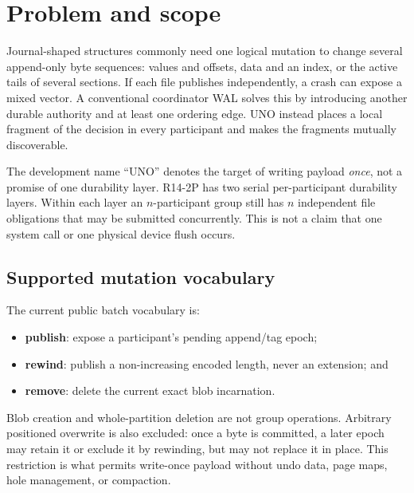 \documentclass[10pt,twocolumn]{article}
\theoremstyle{remark}
\begin{document}
\noindent{}

\section{Problem and scope}

Journal-shaped structures commonly need one logical mutation to change several append-only byte
sequences: values and offsets, data and an index, or the active tails of several sections. If each
file publishes independently, a crash can expose a mixed vector. A conventional coordinator WAL
solves this by introducing another durable authority and at least one ordering edge. UNO instead
places a local fragment of the decision in every participant and makes the fragments mutually
discoverable.

The development name ``UNO'' denotes the target of writing payload \emph{once}, not a promise of
one durability layer. R14-2P has two serial per-participant durability layers. Within each layer an
$n$-participant group still has $n$ independent file obligations that may be submitted
concurrently. This is not a claim that one system call or one physical device flush occurs.

\subsection{Supported mutation vocabulary}

The current public batch vocabulary is:
\begin{itemize}
  \item \textbf{publish}: expose a participant's pending append/tag epoch;
  \item \textbf{rewind}: publish a non-increasing encoded length, never an extension; and
  \item \textbf{remove}: delete the current exact blob incarnation.
\end{itemize}
Blob creation and whole-partition deletion are not group operations. Arbitrary
positioned overwrite is also excluded: once a byte is committed, a later epoch may retain it or
exclude it by rewinding, but may not replace it in place. This restriction is what permits
write-once payload without undo data, page maps, hole management, or compaction.
\end{document}
